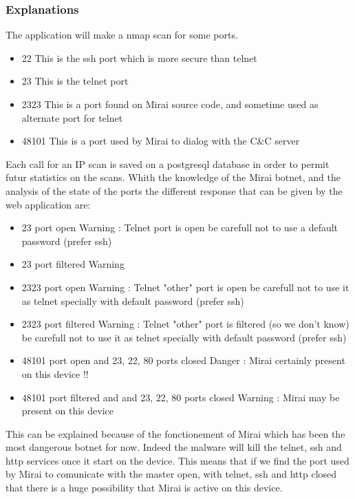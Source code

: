 \documentclass{report}
\begin{document}
\subsubsection{Explanations}
The application will make a nmap scan for some ports.
\begin{itemize}
 \item 22 This is the ssh port which is more secure than telnet
 \item 23 This is the telnet port
 \item 2323 This is a port found on Mirai source code, and sometime used as alternate port for telnet
 \item 48101 This is a port used by Mirai to dialog with the C\&C server
\end{itemize}
Each call for an IP scan is saved on a postgresql database in order to permit futur statistics on the scans. Whith the knowledge of the Mirai botnet, and the analysis of the state of the ports the different response that can be given by the web application are:
\begin{itemize}
\item 23 port open\newline
  Warning : Telnet port is open be carefull not to use a default password (prefer ssh)
\item 23 port filtered\newline
  Warning
\item 2323 port open\newline
  Warning : Telnet "other" port is open be carefull not to use it as telnet specially with default password (prefer ssh)
\item 2323 port filtered\newline
  Warning : Telnet "other" port is filtered (so we don't know) be carefull not to use it as telnet specially with default password (prefer ssh)
\item 48101 port open and 23, 22, 80 ports closed\newline
  Danger : Mirai certainly present on this device !!
\item 48101 port filtered and and 23, 22, 80 ports closed\newline
  Warning : Mirai may be present on this device
\end{itemize}
This can be explained because of the fonctionement of Mirai which has been the most dangerous botnet for now. Indeed the malware will kill the telnet, ssh and http services once it start on the device. This means that if we find the port used by Mirai to comunicate with the master open,  with telnet, ssh and http closed that there is a huge possibility that Mirai is active on this device.
\end{document}
